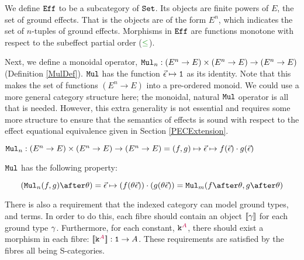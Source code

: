 \begin{framed}
    
    \begin{definition}
        \label{EffDefinition}
        We define $\texttt{Eff}$ to be a subcategory of $\texttt{Set}$. Its objects are finite powers of $E$, the set of ground effects. That is the objects are of the form $E^n$, which indicates the set of $n$-tuples of ground effects. Morphisms in $\texttt{Eff}$ are functions monotone with respect to the subeffect partial order ($\subeffect$).
    \end{definition}
\end{framed}

Next, we define a monoidal operator, $\texttt{Mul}_n: (E^n \rightarrow E)\times (E^n \rightarrow E) \rightarrow (E^n \rightarrow E)$ (Definition \ref{MulDef}). $\texttt{Mul}$ has the function $\vec{\epsilon}\mapsto \texttt{1}$ as its identity. Note that this makes the set of functions $(E^n \rightarrow E)$ into a pre-ordered monoid. We could use a more general category structure here; the monoidal, natural $\texttt{Mul}$ operator is all that is needed. However, this extra generality is not essential and requires some more structure to ensure that the semantics of effects is sound with respect to the effect equational equivalence given in Section \ref{PECExtension}.



\begin{framed}
    \begin{definition}\label{MulDef}
        $\texttt{Mul}_n: (E^n \rightarrow E)\times (E^n \rightarrow E) \rightarrow (E^n \rightarrow E) = (f, g)\mapsto \vec{\epsilon}\mapsto f(\vec{\epsilon})\cdot g(\vec{\epsilon})$
    \end{definition}
    
    \begin{definition}[Naturality]\label{MulNaturality}
        $\texttt{Mul}$ has the following property:

        \begin{equation*}
            (\Mul_n(f, g)\after \theta) = \ev\mapsto(f(\theta \ev))\dot(g(\theta\ev)) = \Mul_m(f\after\theta, g\after\theta)
        \end{equation*}
    \end{definition}
\end{framed}

There is also a requirement that the indexed category can model ground types, and terms. In order to do this,  each fibre should contain an object ${\bf [\![}\gamma{\bf ]\!]}$ for each ground type $\gamma$. Furthermore, for each constant, $\texttt{k}^{\color{purple} A}$, there should exist a morphism in each fibre: ${\bf [\![}\texttt{k}^{\color{purple} A}{\bf ]\!]}: \texttt{1} \rightarrow A$. These requirements are satisfied by the fibres all being S-categories.

